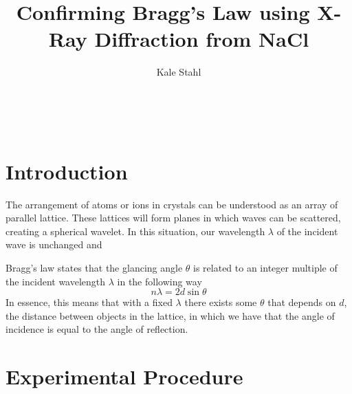 \documentclass[twocolumn]{article}
\title{Confirming Bragg's Law using X-Ray Diffraction from NaCl}
\author{Kale Stahl}
\newcommand{\bd}{\textbf}
\begin{document}
	\makeatletter
	\begin{center}
		{\centering \Large \bd \@title}\\
		\vspace{.5cm}
		{\large \@author}
		\vspace{.25cm}
	\end{center}
	\makeatother
	\begin{abstract}
		
	\end{abstract}
	\section{Introduction}
		The arrangement of atoms or ions in crystals can be understood as an array of parallel lattice. These lattices will form planes in which waves can be scattered, creating a spherical wavelet. In this situation, our wavelength $\lambda$ of the incident wave is unchanged and 
		
		Bragg's law states that the glancing angle $\theta$ is related to an integer multiple of the incident wavelength $\lambda$ in the following way
		\begin{equation}
			n\lambda = 2d\sin \theta \label{bragg's law}
		\end{equation}
		In essence, this means that with a fixed $\lambda$ there exists some $\theta$ that depends on $d$, the distance between objects in the lattice, in which we have that the angle of incidence is equal to the angle of reflection.
		
	\section{Experimental Procedure}
\end{document}
